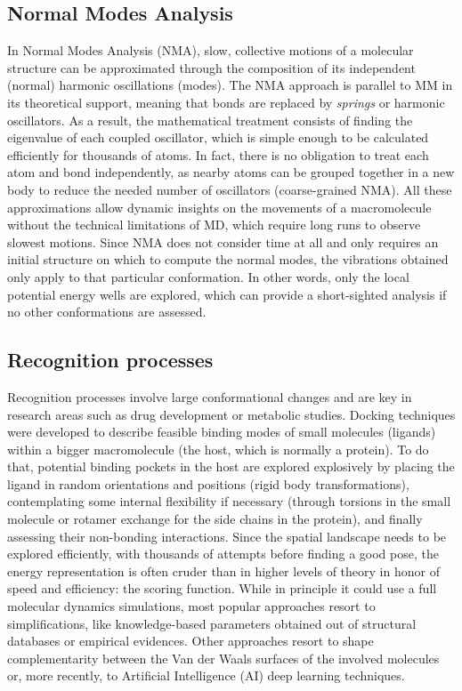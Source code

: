 \subsection{Normal Modes Analysis}

In Normal Modes Analysis (NMA), slow, collective motions of a molecular structure can be approximated through the composition of its independent (normal) harmonic oscillations (modes). The NMA approach is parallel to MM in its theoretical support, meaning that bonds are replaced by \textit{springs} or harmonic oscillators. As a result, the mathematical treatment consists of finding the eigenvalue of each coupled oscillator, which is simple enough to be calculated efficiently for thousands of atoms. In fact, there is no obligation to treat each atom and bond independently, as nearby atoms can be grouped together in a new body to reduce the needed number of oscillators (coarse-grained NMA). All these approximations allow dynamic insights on the movements of a macromolecule without the technical limitations of MD, which require long runs to observe slowest motions. Since NMA does not consider time at all and only requires an initial structure on which to compute the normal modes, the vibrations obtained only apply to that particular conformation. In other words, only the local potential energy wells are explored, which can provide a short-sighted analysis if no other conformations are assessed.

\subsection{Recognition processes}

Recognition processes involve large conformational changes and are key in research areas such as drug development or metabolic studies. Docking techniques were developed to describe feasible binding modes of small molecules (ligands) within a bigger macromolecule (the host, which is normally a protein). To do that, potential binding pockets in the host are explored explosively by placing the ligand in random orientations and positions (rigid body transformations), contemplating some internal flexibility if necessary (through torsions in the small molecule or rotamer exchange for the side chains in the protein), and finally assessing their non-bonding interactions. Since the spatial landscape needs to be explored efficiently, with thousands of attempts before finding a good pose, the energy representation is often cruder than in higher levels of theory in honor of speed and efficiency: the scoring function. While in principle it could use a full molecular dynamics simulations,\cite{Soderhjelm_Tribello_Parrinello_2012,devivo2017} most popular approaches resort to simplifications, like knowledge-based parameters obtained out of structural databases\cite{neudert2011dsx} or empirical evidences.\cite{morris1998automated,baxter1998flexible,korb2009empirical} Other approaches resort to shape complementarity between the Van der Waals surfaces of the involved molecules\cite{venkatachalam2003ligandfit,gabb1997modelling,shoichet1992molecular} or, more recently, to Artificial Intelligence (AI) deep learning techniques.\cite{khamis2015machine}

